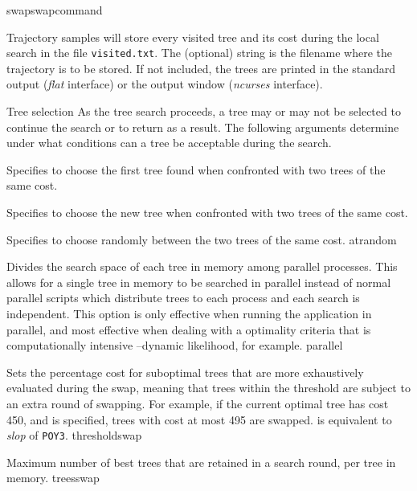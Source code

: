 \begin{command}{swap}{swapcommand}
\begin{arguments}
\begin{argumentgroup}{Trajectory samples}
{ will store every visited tree
and its cost during the local search in the file
\texttt{visited.txt}. The (optional) string is the filename where the
trajectory is to be stored. If not included, the trees are printed
in the standard output (\emph{flat} interface) or the output window (\emph{ncurses}
interface).}
{}

\end{argumentgroup}

\begin{argumentgroup}{Tree selection}
{As the tree search proceeds, a tree may or may not be selected to continue the
search or to return as a result. The following arguments determine under what
conditions can a tree be acceptable during the search.}

{Specifies to choose the first tree found when confronted with two trees of the same cost.}
{}

{Specifies to choose the new tree when confronted with two trees of the same cost.}
{}

{Specifies to choose randomly between the two trees of the same cost.}
{atrandom}

{Divides the search space of each tree in memory among parallel processes. This
allows for a single tree in memory to be searched in parallel instead of normal parallel
scripts which distribute trees to each process and each search is independent. This option is only
effective when running the application in parallel, and most effective when dealing with a optimality
criteria that is computationally intensive --dynamic likelihood, for example.}
{parallel}

{Sets the percentage cost for suboptimal trees that are more exhaustively
evaluated during the swap, meaning that trees within the threshold are subject
to an extra round of swapping. For example, if the current optimal tree has
cost 450, and  is specified, trees with cost at most
495 are swapped.  is equivalent to \emph{slop} of \texttt{POY3}.}
{thresholdswap}

{Maximum number of best trees that are retained in a search round,
per tree in memory.}
{treesswap}

\end{argumentgroup}


\end{arguments}
\end{command}
